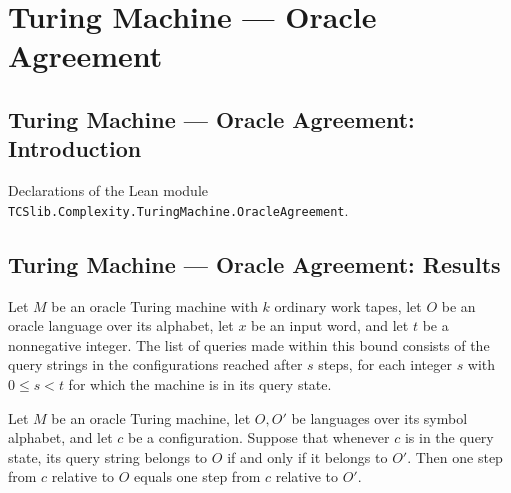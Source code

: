 \section{Turing Machine --- Oracle Agreement}
\subsection*{Turing Machine --- Oracle Agreement: Introduction}

Declarations of the Lean module \texttt{TCSlib.Complexity.TuringMachine.OracleAgreement}.

\subsection*{Turing Machine --- Oracle Agreement: Results}

\begin{definition}
\label{Turing.OracleTM.queriesWithin}
\leanok
{}
Let $M$ be an oracle Turing machine with $k$ ordinary work tapes, let $O$ be an oracle
language over its alphabet, let $x$ be an input word, and let $t$ be a nonnegative
integer. The list of queries made within this bound consists of the query strings in the
configurations reached after $s$ steps, for each integer $s$ with $0\le s<t$ for which
the machine is in its query state.
\end{definition}

\begin{theorem}
\label{Turing.OracleTM.step_eq_of_query_agree}
\leanok
{}
Let $M$ be an oracle Turing machine, let $O,O'$ be languages over its symbol alphabet,
and let $c$ be a configuration. Suppose that whenever $c$ is in the query state, its
query string belongs to $O$ if and only if it belongs to $O'$. Then one step from $c$
relative to $O$ equals one step from $c$ relative to $O'$.
\end{theorem}

